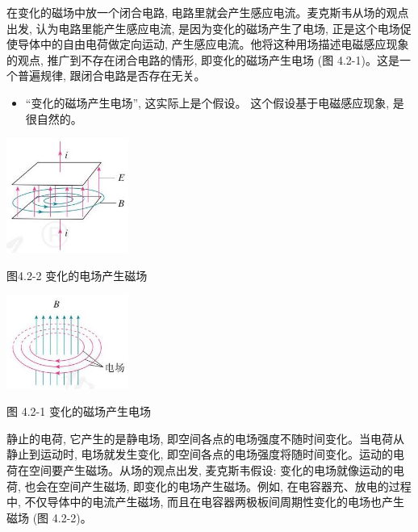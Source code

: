 \documentclass[10pt]{article}
\begin{document}
在变化的磁场中放一个闭合电路, 电路里就会产生感应电流。麦克斯韦从场的观点出发, 认为电路里能产生感应电流, 是因为变化的磁场产生了电场, 正是这个电场促使导体中的自由电荷做定向运动, 产生感应电流。他将这种用场描述电磁感应现象的观点, 推广到不存在闭合电路的情形, 即变化的磁场产生电场 (图 4.2-1)。这是一个普遍规律, 跟闭合电路是否存在无关。

\begin{mdframed}

\begin{itemize}
\item “变化的磁场产生电场”, 这实际上是个假设。 这个假设基于电磁感应现象, 是很自然的。
\end{itemize}

\end{mdframed}

\begin{center}
\includegraphics[max width=0.3\textwidth]{images/01910e72-c5b7-7ed5-a6d4-fb3a5faefc32_81_179528.jpg}
\end{center}

图4.2-2 变化的电场产生磁场

\begin{center}
\includegraphics[max width=0.3\textwidth]{images/01910e72-c5b7-7ed5-a6d4-fb3a5faefc32_81_615472.jpg}
\end{center}

图 4.2-1 变化的磁场产生电场

静止的电荷, 它产生的是静电场, 即空间各点的电场强度不随时间变化。当电荷从静止到运动时, 电场就发生变化, 即空间各点的电场强度将随时间变化。运动的电荷在空间要产生磁场。从场的观点出发, 麦克斯韦假设: 变化的电场就像运动的电荷, 也会在空间产生磁场, 即变化的电场产生磁场。例如, 在电容器充、放电的过程中, 不仅导体中的电流产生磁场, 而且在电容器两极板间周期性变化的电场也产生磁场 (图 4.2-2)。
\end{document}
